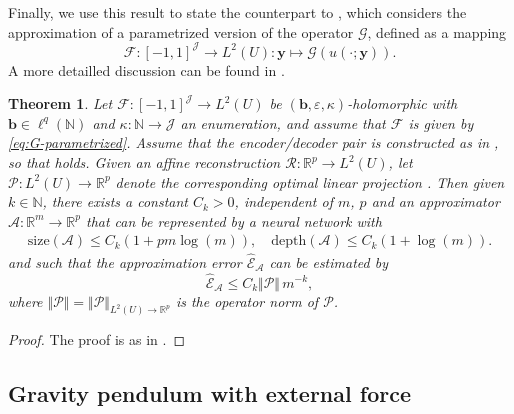 \documentclass{article}
\numberwithin{equation}{section}
\newcommand{\size}{\mathrm{size}}
\newcommand{\depth}{\mathrm{depth}}
\newcommand{\Err}{\widehat{\mathscr{E}}}
\newcommand{\R}{\mathbb{R}}
\newcommand{\N}{\mathbb{N}}
\newcommand{\cA}{\mathcal{A}}
\newcommand{\cF}{\mathcal{F}}
\newcommand{\cG}{\mathcal{G}}
\newcommand{\cJ}{\mathcal{J}}
\newcommand{\cP}{\mathcal{P}}
\newcommand{\cR}{\mathcal{R}}
\renewcommand{\epsilon}{\varepsilon}
\newcommand{\1}{\mathbbm{1}}
\newtheorem{theorem}{Theorem}[section]
\begin{document}
Finally, we use this result to state the counterpart to \cite[Theorem 3.34]{LMK1}, which considers the approximation of a parametrized version of the operator $\cG$, defined as a mapping
\begin{equation}\label{eq:G-parametrized}
    \cF: [-1,1]^\cJ\to L^2(U): \bm{y} \mapsto \cG(u(\cdot; \bm{y})). 
\end{equation}
A more detailled discussion can be found in \cite[Section 3.6.2]{LMK1}.

\begin{theorem} \label{thm:holomorphic-approx}
Let $\cF: [-1,1]^\cJ \to L^2(U)$ be $(\bm{b},\epsilon,\kappa)$-holomorphic with $\bm{b}\in \ell^q(\N)$ and $\kappa: \N \to \cJ$ an enumeration, and assume that $\cF$ is given by \eqref{eq:G-parametrized}. Assume that the encoder/decoder pair is constructed as in \cite[Section 3.5.3]{LMK1}, so that \cite[Eq. (3.69)]{LMK1} holds. Given an affine reconstruction $\cR: \R^p\to L^2(U)$, let $\cP: L^2(U) \to \R^p$ denote the corresponding optimal linear projection \cite[Eq. (3.17)]{LMK1}. Then given $k\in\N$, there exists a constant $C_k>0$, independent of $m$, $p$ and an approximator $\cA: \R^m \to \R^p$ that can be represented by a neural network with
\[
\begin{gathered}
\size(\cA) 
\le
C_k(1+pm \log(m) ), 
\quad
\depth(\cA) \le C_k(1+\log(m)).
\end{gathered}
\]
and such that the approximation error $\Err_{\cA}$ can be estimated by
\[
\Err_{\cA} 
\le
C_k \Vert \cP \Vert \, m^{-k},
\]
where $\Vert \cP \Vert =  \Vert \cP \Vert_{L^2(U) \to \R^p}$ is the operator norm of $\cP$.
\end{theorem}
\begin{proof}
The proof is as in \cite[Appendix C.19.1]{LMK1}.
\end{proof}

\subsection{Gravity pendulum with external force}\label{app:pendulum}
\end{document}
